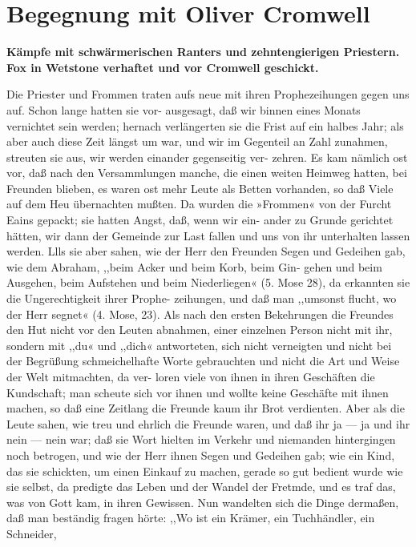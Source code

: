 


\chapter[Begegnung mit Oliver Cromwell]{Begegnung mit Oliver Cromwell}

\begin{center}
\textbf{Kämpfe mit schwärmerischen Ranters und 
zehntengierigen Priestern.
Fox in Wetstone verhaftet und vor Cromwell geschickt.}
\end{center}


Die Priester und Frommen traten aufs neue mit ihren
Prophezeihungen gegen uns auf. Schon lange hatten sie vor-
ausgesagt, daß wir binnen eines Monats vernichtet sein werden;
hernach verlängerten sie die Frist auf ein halbes Jahr; als aber
auch diese Zeit längst um war, und wir im Gegenteil an Zahl
zunahmen, streuten sie aus, wir werden einander gegenseitig ver-
zehren. Es kam nämlich ost vor, daß nach den Versammlungen
manche, die einen weiten Heimweg hatten, bei Freunden blieben,
es waren ost mehr Leute als Betten vorhanden, so daß Viele auf
dem Heu übernachten mußten. Da wurden die »Frommen« von
der Furcht Eains gepackt; sie hatten Angst, daß, wenn wir ein-
ander zu Grunde gerichtet hätten, wir dann der Gemeinde zur
Last fallen und uns von ihr unterhalten lassen werden. Llls sie
aber sahen, wie der Herr den Freunden Segen und Gedeihen
gab, wie dem Abraham, ,,beim Acker und beim Korb, beim Gin-
gehen und beim Ausgehen, beim Aufstehen und beim Niederliegen«
(5. Mose 28), da erkannten sie die Ungerechtigkeit ihrer Prophe-
zeihungen, und daß man ,,umsonst flucht, wo der Herr segnet«
(4. Mose, 23). Als nach den ersten Bekehrungen die Freundes
den Hut nicht vor den Leuten abnahmen, einer einzelnen Person
nicht mit ihr, sondern mit ,,du« und ,,dich« antworteten, sich nicht
verneigten und nicht bei der Begrüßung schmeichelhafte Worte
gebrauchten und nicht die Art und Weise der Welt mitmachten, da ver-
loren viele von ihnen in ihren Geschäften die Kundschaft; man
scheute sich vor ihnen und wollte keine Geschäfte mit ihnen machen,
so daß eine Zeitlang die Freunde kaum ihr Brot verdienten. Aber
als die Leute sahen, wie treu und ehrlich die Freunde waren,
und daß ihr ja — ja und ihr nein — nein war; daß sie Wort hielten
im Verkehr und niemanden hintergingen noch betrogen, und wie
der Herr ihnen Segen und Gedeihen gab; wie ein Kind, das sie
schickten, um einen Einkauf zu machen, gerade so gut bedient
wurde wie sie selbst, da predigte das Leben und der Wandel der
Fretmde, und es traf das, was von Gott kam, in ihren Gewissen.
Nun wandelten sich die Dinge dermaßen, daß man beständig
fragen hörte: ,,Wo ist ein Krämer, ein Tuchhändler, ein Schneider,
 


